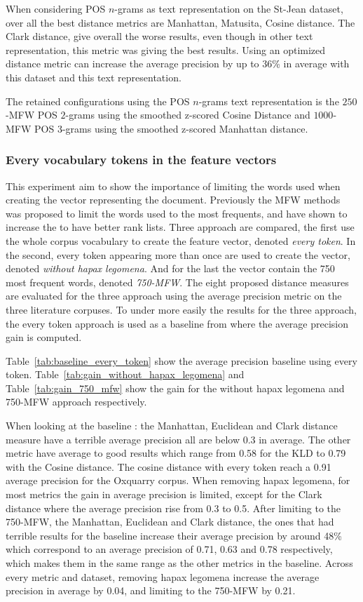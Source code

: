 When considering POS $n$-grams as text representation on the St-Jean dataset, over all the best distance metrics are Manhattan, Matusita, Cosine distance.
The Clark distance, give overall the worse results, even though in other text representation, this metric was giving the best results.
Using an optimized distance metric can increase the average precision by up to $36$\% in average with this dataset and this text representation.

The retained configurations using the POS $n$-grams text representation is the $250$-MFW POS $2$-grams using the smoothed z-scored Cosine Distance and $1000$-MFW POS $3$-grams using the smoothed z-scored Manhattan distance.

\subsubsection{Every vocabulary tokens in the feature vectors}

This experiment aim to show the importance of limiting the words used when creating the vector representing the document.
Previously the MFW methods was proposed to limit the words used to the most frequents, and have shown to increase the
to have better rank lists.
Three approach are compared, the first use the whole corpus vocabulary to create the feature vector, denoted \textit{every token}.
In the second, every token appearing more than once are used to create the vector, denoted \textit{without hapax legomena}.
And for the last the vector contain the 750 most frequent words, denoted \textit{750-MFW}.
The eight proposed distance measures are evaluated for the three approach using the average precision metric on the three literature corpuses.
To under more easily the results for the three approach, the every token approach is used as a baseline from where the average precision gain is computed.

Table~\ref{tab:baseline_every_token} show the average precision baseline using every token.
Table~\ref{tab:gain_without_hapax_legomena} and Table~\ref{tab:gain_750_mfw} show the gain for the without hapax legomena and 750-MFW approach respectively.

When looking at the baseline : the Manhattan, Euclidean and Clark distance measure have a terrible average precision all are below 0.3 in average.
The other metric have average to good results which range from 0.58 for the KLD to 0.79 with the Cosine distance.
The cosine distance with every token reach a 0.91 average precision for the Oxquarry corpus.
When removing hapax legomena, for most metrics the gain in average precision is limited, except for the Clark distance where the average precision rise from 0.3 to 0.5.
After limiting to the 750-MFW, the Manhattan, Euclidean and Clark distance, the ones that had terrible results for the baseline increase their average precision by around 48\% which correspond to an average precision of 0.71, 0.63 and 0.78 respectively, which makes them in the same range as the other metrics in the baseline.
Across every metric and dataset, removing hapax legomena increase the average precision in average by 0.04, and limiting to the 750-MFW by 0.21.

